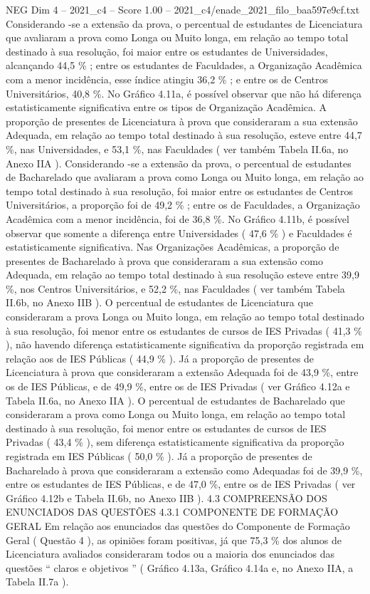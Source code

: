 \begin{textsample}{NEG Dim 4 – 2021\_c4 – Score 1.00 – 2021\_c4/enade\_2021\_filo\_baa597e9cf.txt}
Considerando -se a extensão da prova, o percentual de estudantes de Licenciatura que avaliaram a prova como Longa ou Muito longa, em relação ao tempo total destinado à sua resolução, foi maior entre os estudantes de Universidades, alcançando 44,5 \% ; entre os estudantes de Faculdades, a Organização Acadêmica com a menor incidência, esse índice atingiu 36,2 \% ; e entre os de Centros Universitários, 40,8 \%.
No Gráfico 4.11a, é possível observar que não há diferença estatisticamente significativa entre os tipos de Organização Acadêmica.
A proporção de presentes de Licenciatura à prova que consideraram a sua extensão Adequada, em relação ao tempo total destinado à sua resolução, esteve entre 44,7 \%, nas Universidades, e 53,1 \%, nas Faculdades ( ver também Tabela II.6a, no Anexo IIA ).
Considerando -se a extensão da prova, o percentual de estudantes de Bacharelado que avaliaram a prova como Longa ou Muito longa, em relação ao tempo total destinado à sua resolução, foi maior entre os estudantes de Centros Universitários, a proporção foi de 49,2 \% ; entre os de Faculdades, a Organização Acadêmica com a menor incidência, foi de 36,8 \%.
No Gráfico 4.11b, é possível observar que somente a diferença entre Universidades ( 47,6 \% ) e Faculdades é estatisticamente significativa.
Nas Organizações Acadêmicas, a proporção de presentes de Bacharelado à prova que consideraram a sua extensão como Adequada, em relação ao tempo total destinado à sua resolução esteve entre 39,9 \%, nos Centros Universitários, e 52,2 \%, nas Faculdades ( ver também Tabela II.6b, no Anexo IIB ).
O percentual de estudantes de Licenciatura que consideraram a prova Longa ou Muito longa, em relação ao tempo total destinado à sua resolução, foi menor entre os estudantes de cursos de IES Privadas ( 41,3 \% ), não havendo diferença estatisticamente significativa da proporção registrada em relação aos de IES Públicas ( 44,9 \% ).
Já a proporção de presentes de Licenciatura à prova que consideraram a extensão Adequada foi de 43,9 \%, entre os de IES Públicas, e de 49,9 \%, entre os de IES Privadas ( ver Gráfico 4.12a e Tabela II.6a, no Anexo IIA ).
O percentual de estudantes de Bacharelado que consideraram a prova como Longa ou Muito longa, em relação ao tempo total destinado à sua resolução, foi menor entre os estudantes de cursos de IES Privadas ( 43,4 \% ), sem diferença estatisticamente significativa da proporção registrada em IES Públicas ( 50,0 \% ).
Já a proporção de presentes de Bacharelado à prova que consideraram a extensão como Adequadas foi de 39,9 \%, entre os estudantes de IES Públicas, e de 47,0 \%, entre os de IES Privadas ( ver Gráfico 4.12b e Tabela II.6b, no Anexo IIB ). 4.3 COMPREENSÃO DOS ENUNCIADOS DAS QUESTÕES 4.3.1 COMPONENTE DE FORMAÇÃO GERAL Em relação aos enunciados das questões do Componente de Formação Geral ( Questão 4 ), as opiniões foram positivas, já que 75,3 \% dos alunos de Licenciatura avaliados consideraram todos ou a maioria dos enunciados das questões “ claros e objetivos ” ( Gráfico 4.13a, Gráfico 4.14a e, no Anexo IIA, a Tabela II.7a ).

\end{textsample}
